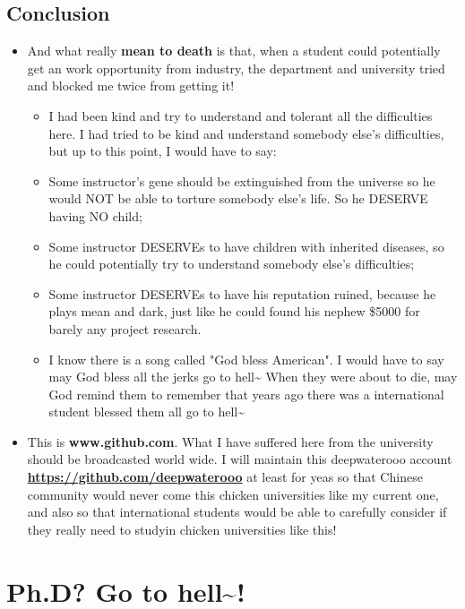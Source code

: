 \documentclass[9pt,b5paper]{article}
\begin{document}
\subsection{Conclusion}
\label{sec-3-2}
\begin{itemize}
\item And what really \textbf{mean to death} is that, when a student could potentially get an work opportunity from industry, the department and university tried and blocked me twice from getting it! 
\begin{itemize}
\item I had been kind and try to understand and tolerant all the difficulties here. I had tried to be kind and understand somebody else's difficulties, but up to this point, I would have to say:
\item Some instructor's gene should be extinguished from the universe so he would NOT be able to torture somebody else's life. So he DESERVE having NO child;
\item Some instructor DESERVEs to have children with inherited diseases, so he could potentially try to understand somebody else's difficulties;
\item Some instructor DESERVEs to have his reputation ruined, because he plays mean and dark, just like he could found his nephew \$5000 for barely any project research.
\item I know there is a song called "God bless American". I would have to say may God bless all the jerks go to hell\textasciitilde{} When they were about to die, may God remind them to remember that years ago there was a international student blessed them all go to hell\textasciitilde{}
\end{itemize}
\item This is \textbf{www.github.com}. What I have suffered here from the university should be broadcasted world wide. I will maintain this deepwaterooo account \textbf{\url{https://github.com/deepwaterooo}} at least for yeas so that Chinese community would never come this chicken universities like my current one, and also so that international students would be able to carefully consider if they really need to studyin chicken universities like this!
\end{itemize}

\section{Ph.D? Go to hell\textasciitilde{}!}
\label{sec-4}
\end{document}
